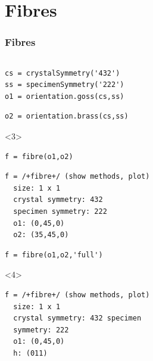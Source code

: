 \documentclass[compress]{beamer}
\begin{document}
\section{Fibres}

\begin{frame}[fragile]
  \frametitle{Fibres}

  \begin{columns}
    \begin{column}{7cm}
      \vspace{-0.5cm}
      \begin{overlayarea}{\textwidth}{8cm}
        \begin{lstlisting}[style=input]
cs = crystalSymmetry('432')
ss = specimenSymmetry('222')
o1 = orientation.goss(cs,ss)
        \end{lstlisting}

        \pause
        \vspace{-0.3cm}
      \begin{lstlisting}[style=input]
o2 = orientation.brass(cs,ss)
      \end{lstlisting}

      \pause

\begin{onlyenv}<3>

\begin{lstlisting}[style=input]
f = fibre(o1,o2)
\end{lstlisting}

  \vspace{-0.3cm}
  \begin{lstlisting}[style=output]
f = /+fibre+/ (show methods, plot)
  size: 1 x 1
  crystal symmetry: 432
  specimen symmetry: 222
  o1: (0,45,0)
  o2: (35,45,0)
  \end{lstlisting}
\end{onlyenv}

\pause

\begin{lstlisting}[style=input]
f = fibre(o1,o2,'full')
\end{lstlisting}
\begin{onlyenv}<4>
  \vspace{-0.3cm}
\begin{lstlisting}[style=output]
f = /+fibre+/ (show methods, plot)
  size: 1 x 1
  crystal symmetry: 432 specimen
  symmetry: 222
  o1: (0,45,0)
  h: (011)
\end{lstlisting}
\end{onlyenv}

\pause


\end{overlayarea}
\end{column}
\end{columns}
\end{frame}
\end{document}
